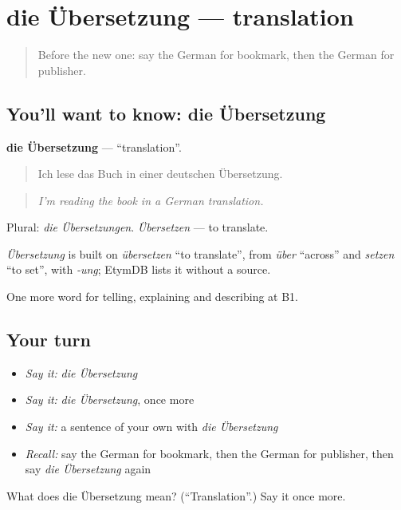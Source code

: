 \section[die Übersetzung]{die Übersetzung — translation}

\label{lesson:GE-C522-uebersetzung}



\begin{quote}
Before the new one: say the German for bookmark, then the German for publisher.
\end{quote}

\subsection*{You'll want to know: die Übersetzung}
\textbf{die Übersetzung} — \textquotedblleft{}translation\textquotedblright{}.

\begin{quote}
Ich lese das Buch in einer deutschen Übersetzung.
\end{quote}

\begin{quote}
\emph{I'm reading the book in a German translation.}
\end{quote}

Plural: \emph{die Übersetzungen}. \emph{Übersetzen} — to translate.

\begin{cousinweb}
\emph{Übersetzung} is built on \emph{übersetzen} \textquotedblleft{}to translate\textquotedblright{}, from \emph{über} \textquotedblleft{}across\textquotedblright{} and \emph{setzen} \textquotedblleft{}to set\textquotedblright{}, with \emph{-ung}; EtymDB lists it without a source.
\end{cousinweb}

\begin{grammarlens}[title={What you've built}]
One more word for telling, explaining and describing at B1.
\end{grammarlens}

\subsection*{Your turn}
\begin{itemize}
\raggedright
  \item \emph{Say it:} \emph{die Übersetzung}
  \item \emph{Say it:} \emph{die Übersetzung}, once more
  \item \emph{Say it:} a sentence of your own with \emph{die Übersetzung}
  \item \emph{Recall:} say the German for bookmark, then the German for publisher, then say \emph{die Übersetzung} again
\end{itemize}

\begin{tcolorbox}[breakable,colback=teal!4,colframe=teal!35!black,title={Before you move on}]
What does die Übersetzung mean? (\textquotedblleft{}Translation\textquotedblright{}.) Say it once more.
\end{tcolorbox}
